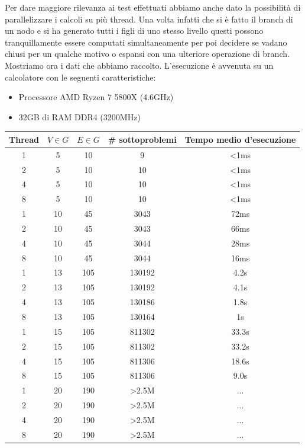 \documentclass[
	article,			%
	12pt,				%
	oneside,			%
	a4paper,			%
	english,			%
	italian,				%
	sumario=tradicional,
	]{abntex2}
\begin{document}
Per dare maggiore rilevanza ai test effettuati abbiamo anche dato la possibilità di parallelizzare i calcoli su più thread. Una volta infatti che si è fatto il branch di un nodo e si ha generato tutti i figli di uno stesso livello questi possono tranquillamente essere computati simultaneamente per poi decidere se vadano chiusi per un qualche motivo o espansi con una ulteriore operazione di branch.
\newline
Mostriamo ora i dati che abbiamo raccolto. L'esecuzione è avvenuta su un calcolatore con le seguenti caratteristiche:
\begin{itemize}
    \item Processore AMD Ryzen 7 5800X (4.6GHz)
    \item 32GB di RAM DDR4 (3200MHz)
\end{itemize}
\begin{center}
 \begin{tabular}{||c c c c c||} 
 \hline
 Thread & $V\in G$ & $E\in G$ & \# sottoproblemi & Tempo medio d'esecuzione\\ [0.5ex] 
 \hline\hline
 1 & 5 & 10 & 9 & <1ms\\ 
 \hline
 2 & 5 & 10 & 10 & <1ms\\
 \hline
 4 & 5 & 10 & 10  & <1ms\\ 
 \hline
 8 & 5 & 10 & 10  & <1ms\\ 
 \hline
 \hline
 1 & 10 & 45 & 3043 & 72ms\\
 \hline
 2 & 10 & 45 & 3043 & 66ms\\
 \hline
 4 & 10 & 45 & 3044 & 28ms\\
 \hline
 8 & 10 & 45 & 3044 & 16ms\\
 \hline
 \hline
 1 & 13 & 105 & 130192 & 4.2s\\
 \hline
 2 & 13 & 105 & 130192 & 4.1s\\
 \hline
 4 & 13 & 105 & 130186 & 1.8s\\
 \hline
 8 & 13 & 105 & 130164 & 1s \\
 \hline
 \hline
 1 & 15 & 105 & 811302 & 33.3s\\
 \hline
 2 & 15 & 105 & 811302 & 33.2s\\
 \hline
 4 & 15 & 105 & 811306 & 18.6s\\
 \hline
 8 & 15 & 105 & 811306 & 9.0s\\
 \hline
  \hline
 1 & 20 & 190 & >2.5M & ...\\
 \hline
 2 & 20 & 190 & >2.5M & ...\\
 \hline
 4 & 20 & 190 & >2.5M & ... \\
 \hline
 8 & 20 & 190 & >2.5M & ... \\
 \hline
\end{tabular}
\end{center}
\end{document}
